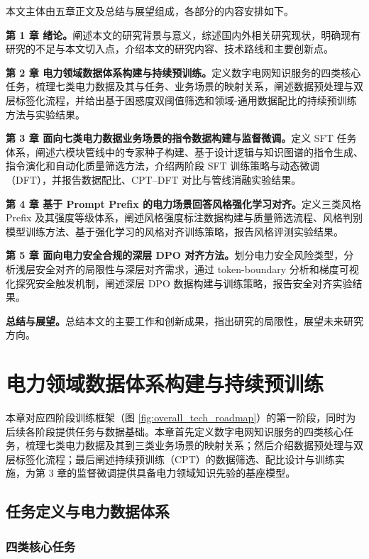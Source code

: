 \documentclass[fontset=fandol,type=master,campus=shenzhen,etitleauto=true]{hithesisbook}
\begin{document}
本文主体由五章正文及总结与展望组成，各部分的内容安排如下。

\textbf{第 1 章 绪论。}阐述本文的研究背景与意义，综述国内外相关研究现状，明确现有研究的不足与本文切入点，介绍本文的研究内容、技术路线和主要创新点。

\textbf{第 2 章 电力领域数据体系构建与持续预训练。}定义数字电网知识服务的四类核心任务，梳理七类电力数据及其与任务、业务场景的映射关系，阐述数据预处理与双层标签化流程，并给出基于困惑度双阈值筛选和领域-通用数据配比的持续预训练方法与实验结果。

\textbf{第 3 章 面向七类电力数据业务场景的指令数据构建与监督微调。}定义 SFT 任务体系，阐述六模块管线中的专家种子构建、基于设计逻辑与知识图谱的指令生成、指令演化和自动化质量筛选方法，介绍两阶段 SFT 训练策略与动态微调（DFT），并报告数据配比、CPT--DFT 对比与管线消融实验结果。

\textbf{第 4 章 基于 Prompt Prefix 的电力场景回答风格强化学习对齐。}定义三类风格 Prefix 及其强度等级体系，阐述风格强度标注数据构建与质量筛选流程、风格判别模型训练方法、基于强化学习的风格对齐训练策略，报告风格评测实验结果。

\textbf{第 5 章 面向电力安全合规的深层 DPO 对齐方法。}划分电力安全风险类型，分析浅层安全对齐的局限性与深层对齐需求，通过 token-boundary 分析和梯度可视化探究安全触发机制，阐述深层 DPO 数据构建与训练策略，报告安全对齐实验结果。

\textbf{总结与展望。}总结本文的主要工作和创新成果，指出研究的局限性，展望未来研究方向。


\chapter{电力领域数据体系构建与持续预训练}\label{ux9762ux5411ux7535ux529bux77e5ux8bc6ux670dux52a1ux7684ux5927ux8bedux8a00ux6a21ux578bux603bux4f53ux6846ux67b6}

本章对应四阶段训练框架（图 \ref{fig:overall_tech_roadmap}）的第一阶段，同时为后续各阶段提供任务与数据基础。本章首先定义数字电网知识服务的四类核心任务，梳理七类电力数据及其到三类业务场景的映射关系；然后介绍数据预处理与双层标签化流程；最后阐述持续预训练（CPT）的数据筛选、配比设计与训练实施，为第 3 章的监督微调提供具备电力领域知识先验的基座模型。

\section{任务定义与电力数据体系}\label{sec:task-data}

\subsection{四类核心任务}\label{ux4efbux52a1ux5b9aux4e49}
\end{document}
